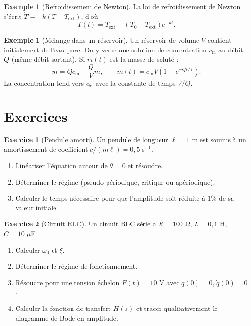 \documentclass[12pt,a4paper,openany]{book}
\theoremstyle{definition}
\newtheorem{exemple}[definition]{Exemple}
\newtheorem{exercice}{Exercice}[chapter]
\theoremstyle{plain}
\theoremstyle{remark}
\begin{document}
\begin{exemple}[Refroidissement de Newton]
\label{ex:newton-refroid}
La loi de refroidissement de Newton s'écrit
$\dot{T} = -k(T - T_{\text{ext}})$, d'où
\[
T(t) = T_{\text{ext}} + (T_0 - T_{\text{ext}})e^{-kt}.
\]
\end{exemple}

\begin{exemple}[Mélange dans un réservoir]
\label{ex:reservoir}
Un réservoir de volume $V$ contient initialement de l'eau pure.
On y verse une solution de concentration $c_{\text{in}}$ au débit
$Q$ (même débit sortant). Si $m(t)$ est la masse de soluté :
\[
\dot{m} = Qc_{\text{in}} - \frac{Q}{V}m, \qquad
m(t) = c_{\text{in}}V(1 - e^{-Qt/V}).
\]
La concentration tend vers $c_{\text{in}}$ avec la constante de
temps $V/Q$.
\end{exemple}

\section{Exercices}
\label{sec:exo-chap10}

\begin{exercice}[Pendule amorti]
\label{exo:pendule-amorti}
Un pendule de longueur $\ell = 1$ m est soumis à un amortissement
de coefficient $c/(m\ell) = 0{,}5$ s$^{-1}$.
\begin{enumerate}[label=\alph*)]
  \item Linéariser l'équation autour de $\theta = 0$ et résoudre.
  \item Déterminer le régime (pseudo-périodique, critique ou
        apériodique).
  \item Calculer le temps nécessaire pour que l'amplitude soit
        réduite à $1\%$ de sa valeur initiale.
\end{enumerate}
\end{exercice}

\begin{exercice}[Circuit RLC]
\label{exo:RLC}
Un circuit RLC série a $R = 100\;\Omega$, $L = 0{,}1$ H,
$C = 10\;\mu$F.
\begin{enumerate}[label=\alph*)]
  \item Calculer $\omega_0$ et $\xi$.
  \item Déterminer le régime de fonctionnement.
  \item Résoudre pour une tension échelon $E(t) = 10$ V avec
        $q(0) = 0$, $\dot{q}(0) = 0$.
  \item Calculer la fonction de transfert $H(s)$ et tracer
        qualitativement le diagramme de Bode en amplitude.
\end{enumerate}
\end{exercice}
\end{document}
